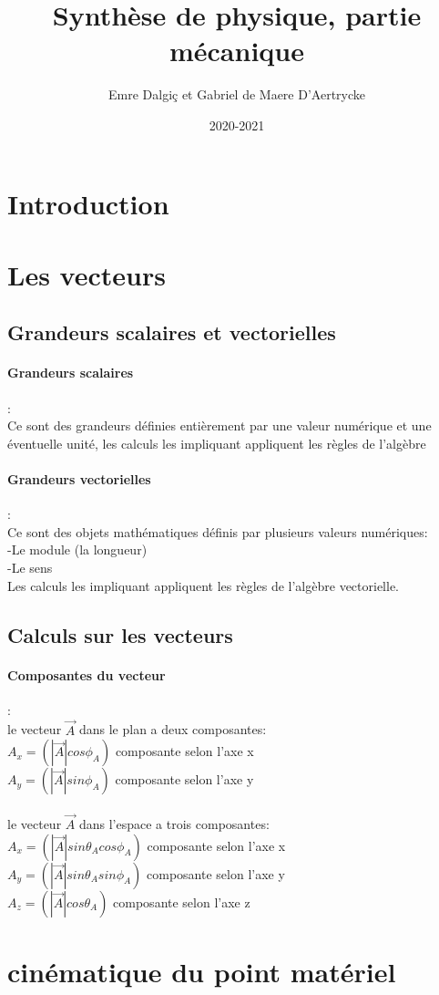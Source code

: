 \documentclass[a4paper,11pt]{article}
\begin{document}
\title{Synthèse de physique, partie mécanique}
\date{2020-2021}
\author{Emre Dalgiç et Gabriel de Maere D'Aertrycke}

\maketitle

\section{Introduction}
\section{Les vecteurs}
	\subsection{Grandeurs scalaires et vectorielles}
		\paragraph{Grandeurs scalaires} : \\Ce sont des grandeurs définies 					entièrement par une valeur numérique et une éventuelle unité, les calculs 		les impliquant appliquent les règles de l'algèbre
			
		\paragraph{Grandeurs vectorielles} :\\ Ce sont des objets mathématiques 			définis par plusieurs valeurs numériques:\\
		-Le module (la longueur)\\
		-Le sens\\
		Les calculs les impliquant appliquent les règles de l'algèbre 						vectorielle.
		
	\subsection{Calculs sur les vecteurs}
	\paragraph{Composantes du vecteur}:\\
	le vecteur $\vec{A}$ dans le plan a deux composantes:
	\\ $A_x = (|\vec{A}|cos\phi_A)$ composante selon l'axe x
	\\ $A_y = (|\vec{A}|sin\phi_A)$ composante selon l'axe y
	\\
	\\le vecteur $\vec{A}$ dans l'espace a trois 	composantes:
	\\ $A_x = (|\vec{A}|sin\theta_Acos\phi_A)$ composante selon l'axe x
	\\ $A_y = (|\vec{A}|sin\theta_Asin\phi_A)$ composante selon l'axe y
	\\ $A_z = (|\vec{A}|cos\theta_A)$ composante selon l'axe z
	
	
	

\section{cinématique du point matériel}
\end{document}
